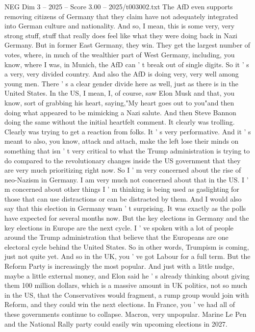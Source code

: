 \begin{textsample}{NEG Dim 3 – 2025 – Score 3.00 – 2025/t003002.txt}
The AfD even supports removing citizens of Germany that they claim have not adequately integrated into German culture and nationality.
And so, I mean, this is some very, very strong stuff, stuff that really does feel like what they were doing back in Nazi Germany.
But in former East Germany, they win.
They get the largest number of votes, where, in much of the wealthier part of West Germany, including, you know, where I was, in Munich, the AfD can ' t break out of single digits.
So it ' s a very, very divided country.
And also the AfD is doing very, very well among young men.
There ' s a clear gender divide here as well, just as there is in the United States.
In the US, I mean, I, of course, saw Elon Musk and that, you know, sort of grabbing his heart, saying,"My heart goes out to you"and then doing what appeared to be mimicking a Nazi salute.
And then Steve Bannon doing the same without the initial heartfelt comment.
It clearly was trolling.
Clearly was trying to get a reaction from folks.
It ' s very performative.
And it ' s meant to also, you know, attack and attach, make the left lose their minds on something that isn ' t very critical to what the Trump administration is trying to do compared to the revolutionary changes inside the US government that they are very much prioritizing right now.
So I ' m very concerned about the rise of neo-Nazism in Germany.
I am very much not concerned about that in the US.
I ' m concerned about other things I ' m thinking is being used as gaslighting for those that can use distractions or can be distracted by them.
And I would also say that this election in Germany wasn ' t surprising.
It was exactly as the polls have expected for several months now.
But the key elections in Germany and the key elections in Europe are the next cycle.
I ' ve spoken with a lot of people around the Trump administration that believe that the Europeans are one electoral cycle behind the United States.
So in other words, Trumpism is coming, just not quite yet.
And so in the UK, you ' ve got Labour for a full term.
But the Reform Party is increasingly the most popular.
And just with a little nudge, maybe a little external money, and Elon said he ' s already thinking about giving them 100 million dollars, which is a massive amount in UK politics, not so much in the US, that the Conservatives would fragment, a rump group would join with Reform, and they could win the next elections.
In France, you ' ve had all of these governments continue to collapse.
Macron, very unpopular.
Marine Le Pen and the National Rally party could easily win upcoming elections in 2027.

\end{textsample}
